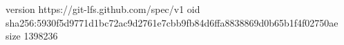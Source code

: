 version https://git-lfs.github.com/spec/v1
oid sha256:5930f5d9771d1bc72ac9d2761e7cbb9fb84d6ffa8838869d0b65b1f4f02750ae
size 1398236
